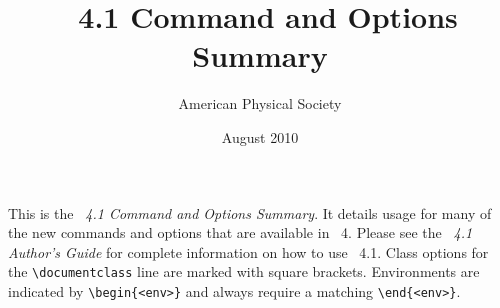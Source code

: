 \documentclass[%
twocolumn,secnumarabic,amssymb, amsmath, nofootinbib,tightenlines,
nobibnotes, aps, 
prl,
]{revtex4-1}
\begin{document}
\title[Command Option Summary]{\revtex~4.1 Command and Options Summary}%

\author{American Physical Society}%
\date{August 2010}%
\maketitle

This is the \textit{\revtex~4.1 Command and Options Summary}. It details
usage for many of the new commands and options that are available in
\revtex~4. Please see the \textit{\revtex~4.1 Author's Guide} for
complete information on how to use \revtex~4.1.  Class options for the
\verb+\documentclass+ line are marked with square
brackets. Environments are indicated by \verb+\begin{<env>}+ and always
require a matching \verb+\end{<env>}+.
\end{document}
